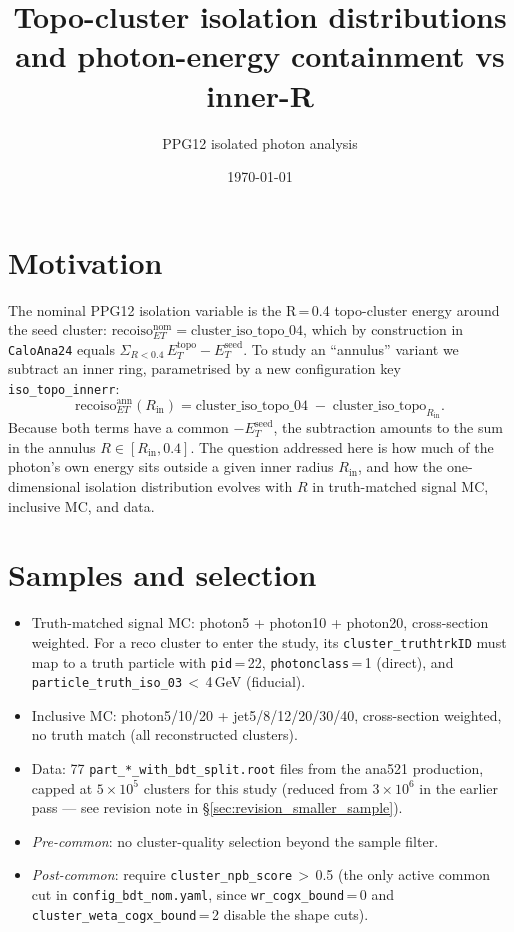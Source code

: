 \documentclass[11pt]{article}
\title{Topo-cluster isolation distributions and photon-energy containment vs inner-R}
\author{PPG12 isolated photon analysis}
\date{\today}
\begin{document}
\maketitle

\section{Motivation}

The nominal PPG12 isolation variable is the R\,=\,0.4 topo-cluster energy around the seed
cluster: $\text{recoiso}_{ET}^{\text{nom}} = \text{cluster\_iso\_topo\_04}$, which by
construction in \texttt{CaloAna24} equals $\Sigma_{R<0.4}\,E_T^{\text{topo}} - E_T^{\text{seed}}$.
To study an ``annulus'' variant we subtract an inner ring, parametrised by a new
configuration key \texttt{iso\_topo\_innerr}:
\begin{equation*}
\text{recoiso}_{ET}^{\text{ann}}(R_\text{in}) =
  \text{cluster\_iso\_topo\_04} \;-\; \text{cluster\_iso\_topo}_{R_\text{in}}.
\end{equation*}
Because both terms have a common $-E_T^{\text{seed}}$, the subtraction amounts to the sum in
the annulus $R \in [R_\text{in}, 0.4]$. The question addressed here is how much of the
photon's own energy sits outside a given inner radius $R_\text{in}$, and how the one-dimensional
isolation distribution evolves with $R$ in truth-matched signal MC, inclusive MC, and data.

\section{Samples and selection}

\begin{itemize}
  \item Truth-matched signal MC: photon5 + photon10 + photon20, cross-section weighted.
        For a reco cluster to enter the study, its \texttt{cluster\_truthtrkID} must map to a
        truth particle with \texttt{pid}\,=\,22, \texttt{photonclass}\,=\,1 (direct),
        and \texttt{particle\_truth\_iso\_03}\,$<$\,4\,GeV (fiducial).
  \item Inclusive MC: photon5/10/20 + jet5/8/12/20/30/40, cross-section weighted,
        no truth match (all reconstructed clusters).
  \item Data: 77 \texttt{part\_*\_with\_bdt\_split.root} files from the ana521 production,
        capped at $5{\times}10^{5}$ clusters for this study (reduced from $3{\times}10^{6}$ in
        the earlier pass — see revision note in \S\ref{sec:revision_smaller_sample}).
  \item \emph{Pre-common}: no cluster-quality selection beyond the sample filter.
  \item \emph{Post-common}: require \texttt{cluster\_npb\_score}\,$>$\,0.5 (the only active
        common cut in \texttt{config\_bdt\_nom.yaml}, since \texttt{wr\_cogx\_bound}\,=\,0 and
        \texttt{cluster\_weta\_cogx\_bound}\,=\,2 disable the shape cuts).
\end{itemize}
\end{document}
